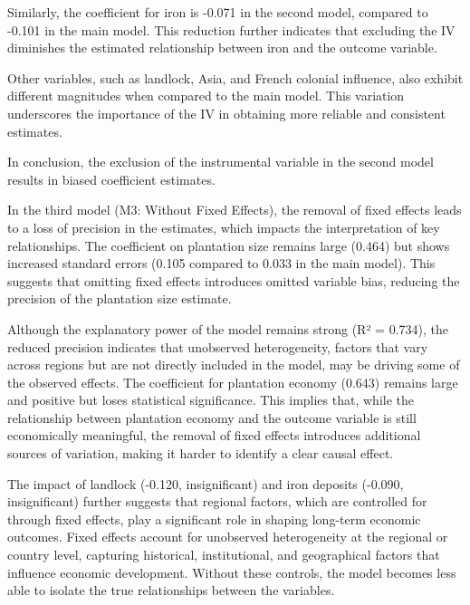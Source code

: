\documentclass[12pt]{article}
\begin{document}
\noindent Similarly, the coefficient for iron is -0.071 in the second model, compared to -0.101 in the main model. This reduction further indicates that excluding the IV diminishes the estimated relationship between iron and the outcome variable.

\noindent Other variables, such as landlock, Asia, and French colonial influence, also exhibit different magnitudes when compared to the main model. This variation underscores the importance of the IV in obtaining more reliable and consistent estimates.

\noindent In conclusion, the exclusion of the instrumental variable in the second model results in biased coefficient estimates. 

\vspace{0.3 in} 

\noindent In the third model (M3: Without Fixed Effects), the removal of fixed effects leads to a loss of precision in the estimates, which impacts the interpretation of key relationships. The coefficient on plantation size remains large (0.464) but shows increased standard errors (0.105 compared to 0.033 in the main model). This suggests that omitting fixed effects introduces omitted variable bias, reducing the precision of the plantation size estimate.

\noindent Although the explanatory power of the model remains strong (R² = 0.734), the reduced precision indicates that unobserved heterogeneity, factors that vary across regions but are not directly included in the model, may be driving some of the observed effects. The coefficient for plantation economy (0.643) remains large and positive but loses statistical significance. This implies that, while the relationship between plantation economy and the outcome variable is still economically meaningful, the removal of fixed effects introduces additional sources of variation, making it harder to identify a clear causal effect.

\noindent The impact of landlock (-0.120, insignificant) and iron deposits (-0.090, insignificant) further suggests that regional factors, which are controlled for through fixed effects, play a significant role in shaping long-term economic outcomes. Fixed effects account for unobserved heterogeneity at the regional or country level, capturing historical, institutional, and geographical factors that influence economic development. Without these controls, the model becomes less able to isolate the true relationships between the variables.
\end{document}
